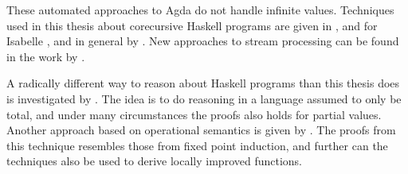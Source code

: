 These automated approaches to Agda do not handle infinite
values. Techniques used in this thesis about corecursive Haskell
programs are given in \citep{corecursive}, and for Isabelle
\citep{mechanizingcoinduction}, and in general by
\citep{coindtutorial}. New approaches to stream processing can be
found in the work by \cite{streams}.

A radically different way to reason about Haskell programs than this
thesis does is investigated by \cite{fastandloose}. The idea is to do
reasoning in a language assumed to only be total, and under many
circumstances the proofs also holds for partial values. Another
approach based on operational semantics is given by
\cite{totalcorrectness}. The proofs from this technique resembles
those from fixed point induction, and further can the techniques also
be used to derive locally improved functions.
